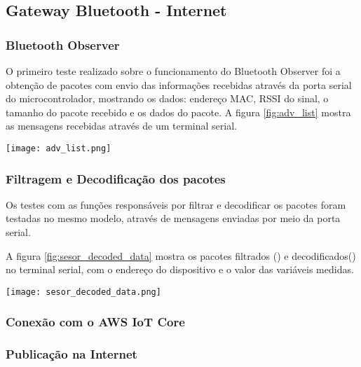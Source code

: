 \subsection{Gateway Bluetooth - Internet}

\subsubsection{Bluetooth Observer}
 
O primeiro teste realizado sobre o funcionamento do Bluetooth Observer foi a
obtenção de pacotes com envio das informações recebidas através da porta serial
do microcontrolador, mostrando os dados: endereço MAC, RSSI do sinal, o tamanho
do pacote recebido e os dados do pacote. A figura \ref{fig:adv_list} mostra as
mensagens recebidas através de um terminal serial.

\begin{center}
	\centering 
	\texttt{[image: adv\_list.png]}
	\label{fig:adv_list}
\end{center} 

\subsubsection{Filtragem e Decodificação dos pacotes}
Os testes com as funções responsáveis por filtrar e decodificar os pacotes foram
testadas no mesmo modelo, através de mensagens enviadas por meio da porta
serial.

A figura \ref{fig:sesor_decoded_data} mostra os pacotes filtrados
() e decodificados() no
terminal serial, com o endereço do dispositivo e o valor das variáveis medidas.

\begin{center}
	\centering 
	\texttt{[image: sesor\_decoded\_data.png]}
	\label{fig:sesor_decoded_data}
\end{center} 


\subsubsection{Conexão com o AWS IoT Core}

\subsubsection{Publicação na Internet}

